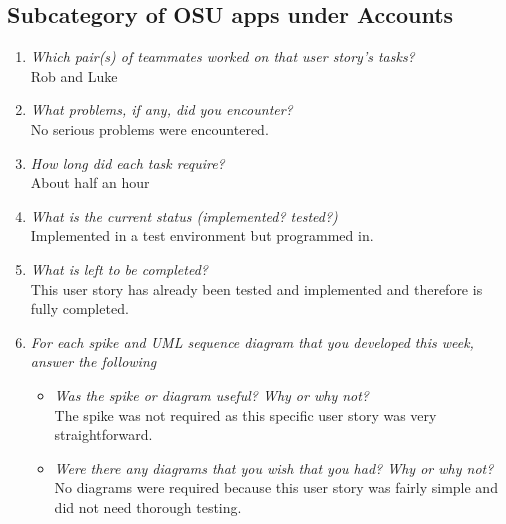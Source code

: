 \documentclass[12pt, letterpaper]{article}
\begin{document}
\subsection{Subcategory of OSU apps under Accounts}
\begin{enumerate}
	\item \emph{Which pair(s) of teammates worked on that user story's tasks?}
	\\Rob and Luke
	\item \emph{What problems, if any, did you encounter?}
	\\No serious problems were encountered.
	\item \emph{How long did each task require?}
	\\About half an hour
	\item \emph{What is the current status (implemented? tested?)}
	\\Implemented in a test environment but programmed in.
	\item \emph{What is left to be completed?}
	\\This user story has already been tested and implemented and therefore is fully completed.
	\item \emph{For each spike and UML sequence diagram that you developed this week, answer the following}
	\begin{itemize}
		\item \emph{Was the spike or diagram useful? Why or why not?}
		\\The spike was not required as this specific user story was very straightforward.
		\item \emph{Were there any diagrams that you wish that you had? Why or why not?}
		\\No diagrams were required because this user story was fairly simple and did not need thorough testing.
	\end{itemize}
\end{enumerate}
\end{document}

